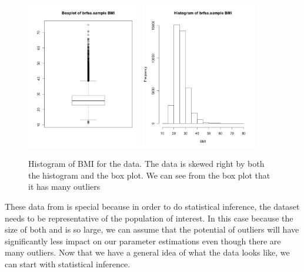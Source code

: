 \begin{figure}
\centering
\includegraphics[width=0.45\textwidth]{ch_inference_foundations_oi_biostat/figures/run10SampHistograms/bmi_boxplot}
\includegraphics[width=0.45\textwidth]{ch_inference_foundations_oi_biostat/figures/run10SampHistograms/bmi_hist}
\caption{Histogram of BMI for the  data. The data is skewed right by both the histogram and the box plot. We can see from the box plot that it  has many outliers}
\label{exploreBMI}
\end{figure}


These data from  is special because in order to do statistical inference, the dataset needs to be representative of the population of interest. In this case because the size of both  and  is so large, we can assume that the potential of outliers will have significantly less impact on our parameter estimations even though there are many outliers. Now that we have a general idea of what the data looks like, we can start with statistical inference.

